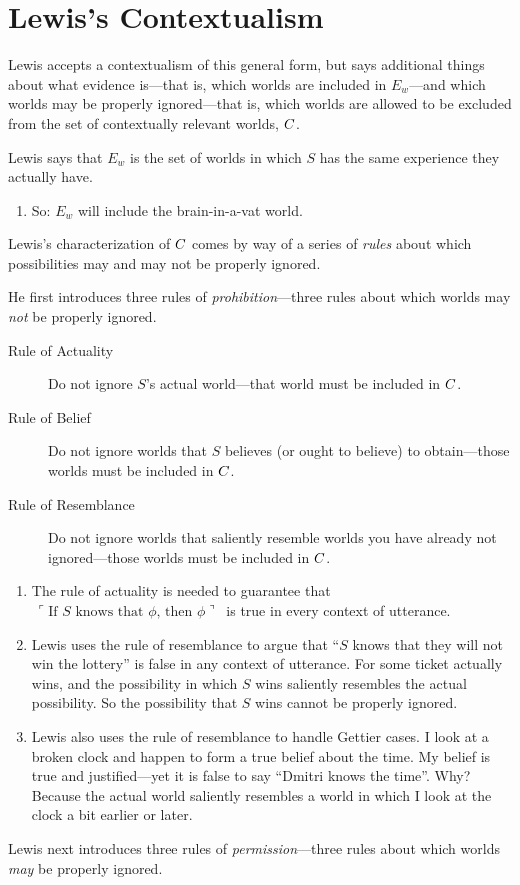 \documentclass[landscape, two column, full page,reqno]{article}
\let\mathcal\relax
\newcommand{\mathcal}{\OMScal}%
\newcommand{\qe}{\begin{enumerate}}
\newcommand{\ze}{\end{enumerate}}
\newcommand{\p}{\item}
\newcommand{\e}{\emph}
\newcommand{\qq}[1]{~\ulcorner #1  \urcorner~}
\begin{document}
\section{Lewis's Contextualism}

\p Lewis accepts a contextualism of this general form, but says additional things about what evidence is---that is, which worlds are included in $E_w$---and which worlds may be properly ignored---that is, which worlds are allowed to be excluded from the set of contextually relevant worlds, $\mathcal{C}$.
\p Lewis says that $E_w$ is the set of worlds in which $S$ has the same experience they actually have.
	\qe
	\p So: $E_w$ will include the brain-in-a-vat world.
	\ze 
\p Lewis's characterization of $\mathcal{C}$ comes by way of a series of \e{rules} about which possibilities may and may not be properly ignored.
\p He first introduces three rules of \e{prohibition}---three rules about which worlds may \e{not} be properly ignored.
	\begin{description}
	\item[Rule of Actuality] Do not ignore $S$'s actual world---that world must be included in $\mathcal{C}$.
	\item[Rule of Belief] Do not ignore worlds that $S$ believes (or ought to believe) to obtain---those worlds must be included in $\mathcal{C}$.
	\item[Rule of Resemblance] Do not ignore worlds that saliently resemble worlds you have already not ignored---those worlds must be included in $\mathcal{C}$.
	\end{description}
	\qe
	\p The rule of actuality is needed to guarantee that $\qq{\text{If $S$ knows that $\phi$, then $\phi$}}$ is true in every context of utterance.
	\p Lewis uses the rule of resemblance to argue that ``$S$ knows that they will not win the lottery'' is false in any context of utterance.  For some ticket actually wins, and the possibility in which $S$ wins saliently resembles the actual possibility.  So the possibility that $S$ wins cannot be properly ignored.
	\p Lewis also uses the rule of resemblance to handle Gettier cases.  I look at a broken clock and happen to form a true belief about the time.  My belief is true and justified---yet it is false to say ``Dmitri knows the time''.  Why?  Because the actual world saliently resembles  a world in which I look at the clock a bit earlier or later.
	\ze 
\p Lewis next introduces three rules of \e{permission}---three rules about which worlds \e{may} be properly ignored.
\end{document}
